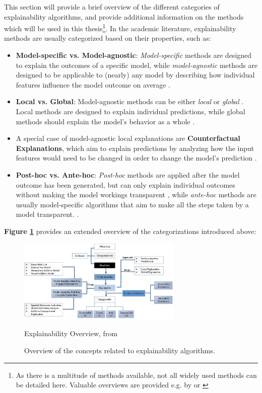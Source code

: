 This section will provide a brief overview of the different categories of explainability algorithms, and provide additional information on the methods which will be used in this thesis\footnote{As there is a multitude of methods available, not all widely used methods can be detailed here. Valuable overviews are provided e.g. by \cite{SALEEM2022165} or \cite{Molnar2023}}.
In the academic literature, explainability methods are usually categorized based on their properties, such as:
\begin{itemize}
    \item \textbf{Model-specific vs. Model-agnostic}: \textit{Model-specific} methods are designed to explain the outcomes of a specific model, while \textit{model-agnostic} methods are designed to be applicable to (nearly) any model by describing how individual features influence the model outcome on average \parencite{Molnar2023}.
    \item \textbf{Local vs. Global}: Model-agnostic methods can be either \textit{local} or \textit{global} \parencite{Molnar2023}. Local methods are designed to explain individual predictions, while global methods should explain the model's behavior as a whole \parencite{SALEEM2022165}.
    \item A special case of model-agnostic local explanations are \textbf{Counterfactual Explanations}, which aim to explain predictions by analyzing how the input features would need to be changed in order to change the model's prediction \parencite{wachter2017}.
    \item \textbf{Post-hoc vs. Ante-hoc}: \textit{Post-hoc} methods are applied after the model outcome has been generated, but can only explain individual outcomes without making the model workings transparent \parencite{Lipton2018}, while \textit{ante-hoc} methods are usually model-specific algorithms that aim to make all the steps taken by a model transparent. \parencite{SALEEM2022165}.
\end{itemize}

\textbf{Figure \ref{fig:Explainability_overview}} provides an extended overview of the categorizations introduced above:

\begin{figure}[h]
    \centering
    \includegraphics[width=0.7\textwidth]{images/CH02_algorithms_overview_Saleem.jpg}
    \caption{Explainability Overview, from \cite{SALEEM2022165}}
    \caption*{Overview of the concepts related to explainability algorithms.}
    \label{fig:Explainability_overview}
\end{figure}

